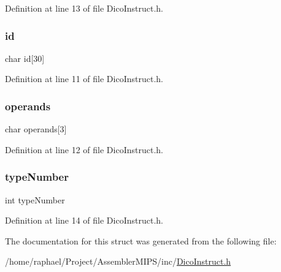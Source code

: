 Definition at line 13 of file Dico\+Instruct.\+h.

\mbox{\label{struct_i_n_s_t_r_u_c_t_i_o_n_a29715edd3daae6d5b9cb15704f224b75}} 
\subsubsection{\texorpdfstring{id}{id}}
{\footnotesize\ttfamily char id\mbox{[}30\mbox{]}}



Definition at line 11 of file Dico\+Instruct.\+h.

\mbox{\label{struct_i_n_s_t_r_u_c_t_i_o_n_a8b7efa1cba40cfc8101d16c03857fc6b}} 
\subsubsection{\texorpdfstring{operands}{operands}}
{\footnotesize\ttfamily char operands\mbox{[}3\mbox{]}}



Definition at line 12 of file Dico\+Instruct.\+h.

\mbox{\label{struct_i_n_s_t_r_u_c_t_i_o_n_a1852ececfb6b7e1f134dbb876feb2c52}} 
\subsubsection{\texorpdfstring{type\+Number}{typeNumber}}
{\footnotesize\ttfamily int type\+Number}



Definition at line 14 of file Dico\+Instruct.\+h.



The documentation for this struct was generated from the following file\+:\begin{DoxyCompactItemize}
\item 
/home/raphael/\+Project/\+Assembler\+M\+I\+P\+S/inc/\mbox{\hyperlink{_dico_instruct_8h}{Dico\+Instruct.\+h}}\end{DoxyCompactItemize}
